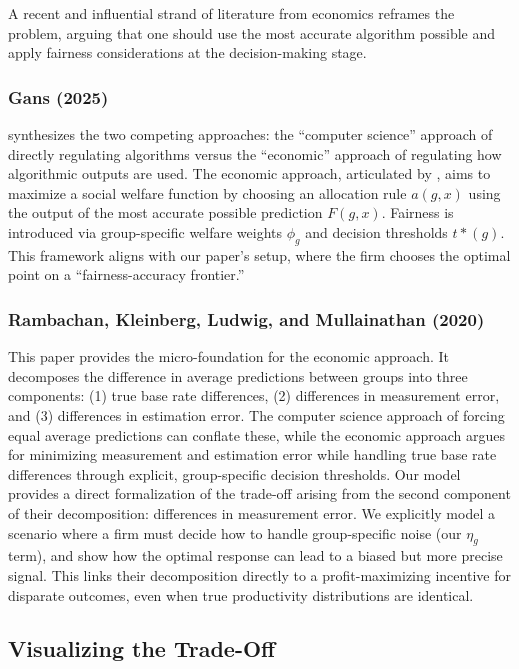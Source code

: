 A recent and influential strand of literature from economics reframes the problem, arguing that one should use the most accurate algorithm possible and apply fairness considerations at the decision-making stage.

\subsubsection{Gans (2025)}

\citet{Gans2025} synthesizes the two competing approaches: the ``computer science'' approach of directly regulating algorithms versus the ``economic'' approach of regulating how algorithmic outputs are used. The economic approach, articulated by \citet{Rambachan2020}, aims to maximize a social welfare function by choosing an allocation rule $a(g,x)$ using the output of the most accurate possible prediction $F(g,x)$. Fairness is introduced via group-specific welfare weights $\phi_g$ and decision thresholds $t*(g)$. This framework aligns with our paper's setup, where the firm chooses the optimal point on a ``fairness-accuracy frontier.'' 

\subsubsection{Rambachan, Kleinberg, Ludwig, and Mullainathan (2020)}

This paper provides the micro-foundation for the economic approach. It decomposes the difference in average predictions between groups into three components: (1) true base rate differences, (2) differences in measurement error, and (3) differences in estimation error. The computer science approach of forcing equal average predictions can conflate these, while the economic approach argues for minimizing measurement and estimation error while handling true base rate differences through explicit, group-specific decision thresholds. Our model provides a direct formalization of the trade-off arising from the second component of their decomposition: differences in measurement error. We explicitly model a scenario where a firm must decide how to handle group-specific noise (our $\eta_g$ term), and show how the optimal response can lead to a biased but more precise signal. This links their decomposition directly to a profit-maximizing incentive for disparate outcomes, even when true productivity distributions are identical.

\subsection{Visualizing the Trade-Off}

